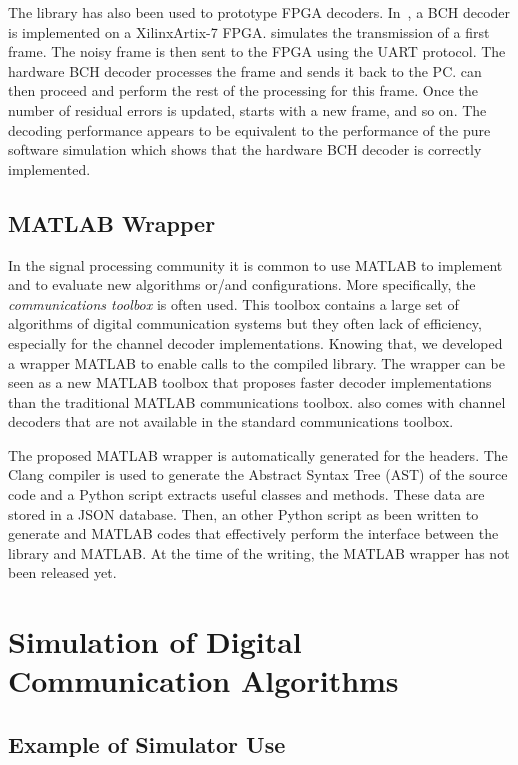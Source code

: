 The \AFFECT library has also been used to prototype FPGA decoders.
In~\cite{Cassagne2017a}, a BCH decoder is implemented on a Xilinx\R Artix-7
FPGA. \AFFECT simulates the transmission of a first frame. The noisy frame is
then sent to the FPGA using the UART protocol. The hardware BCH decoder
processes the frame and sends it back to the PC. \AFFECT can then proceed and
perform the rest of the processing for this frame. Once the number of residual
errors is updated, \AFFECT starts with a new frame, and so on. The decoding
performance appears to be equivalent to the performance of the pure software
simulation which shows that the hardware BCH decoder is correctly implemented.

\subsection{MATLAB Wrapper}

In the signal processing community it is common to use MATLAB to implement and
to evaluate new algorithms or/and configurations. More specifically, the
\emph{communications toolbox} is often used. This toolbox contains a large set
of algorithms of digital communication systems but they often lack of
efficiency, especially for the channel decoder implementations. Knowing that,
we developed a wrapper MATLAB to enable calls to the compiled \AFFECT library.
The wrapper can be seen as a new MATLAB toolbox that proposes faster decoder
implementations than the traditional MATLAB communications toolbox. \AFFECT
also comes with channel decoders that are not available in the standard
communications toolbox.

The proposed MATLAB wrapper is automatically generated for the \AFFECT headers.
The Clang compiler is used to generate the Abstract Syntax Tree (AST) of the
\AFFECT source code and a Python script extracts useful classes and methods.
These data are stored in a JSON database. Then, an other Python script as been
written to generate \Cxx and MATLAB codes that effectively perform the interface
between the \AFFECT library and MATLAB.
At the time of the writing, the MATLAB wrapper has not been released yet.

\section{Simulation of Digital Communication Algorithms}

\subsection{Example of Simulator Use}
\label{sec:aff3ct_simulator_example}

